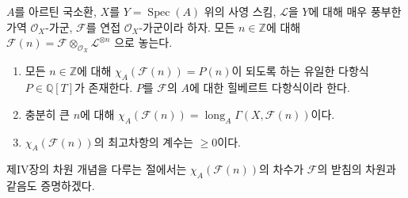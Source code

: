 \begin{theorem}[2.5.3]
\label{III.2.5.3-fr}
$A$를 아르틴 국소환, $X$를 $Y=\operatorname{Spec}(A)$ 위의 사영 스킴,
$\mathcal L$을 $Y$에 대해 매우 풍부한 가역 $\mathcal O_X$-가군,
$\mathcal F$를 연접 $\mathcal O_X$-가군이라 하자. 모든
$n\in\mathbb Z$에 대해
$\mathcal F(n)=\mathcal F\otimes_{\mathcal O_X}\mathcal L^{\otimes n}$
으로 놓는다.
\begin{enumerate}
\item[(i)] 모든 $n\in\mathbb Z$에 대해
$\chi_A(\mathcal F(n))=P(n)$이 되도록 하는 유일한 다항식
$P\in\mathbb Q[T]$가 존재한다. $P$를 $\mathcal F$의 $A$에 대한
힐베르트 다항식이라 한다.
\item[(ii)] 충분히 큰 $n$에 대해
$\chi_A(\mathcal F(n))=\operatorname{long}_A
\Gamma(X,\mathcal F(n))$이다.
\item[(iii)] $\chi_A(\mathcal F(n))$의 최고차항의 계수는
$\geq0$이다.
\end{enumerate}
\end{theorem}

제IV장의 차원 개념을 다루는 절에서는
$\chi_A(\mathcal F(n))$의 차수가 $\mathcal F$의 받침의 차원과
같음도 증명하겠다.

